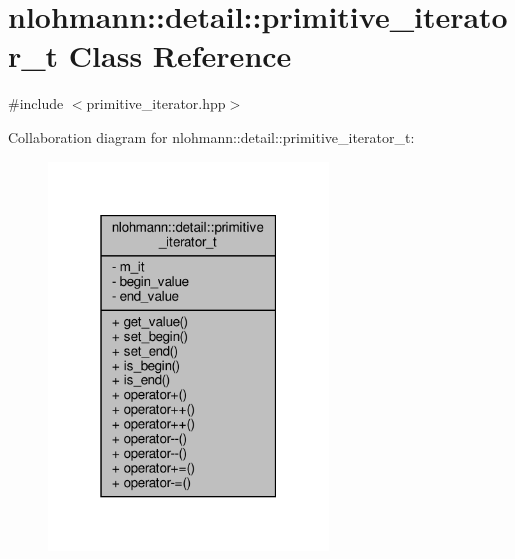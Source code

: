\hypertarget{classnlohmann_1_1detail_1_1primitive__iterator__t}{}\section{nlohmann\+:\+:detail\+:\+:primitive\+\_\+iterator\+\_\+t Class Reference}
\label{classnlohmann_1_1detail_1_1primitive__iterator__t}


{\ttfamily \#include $<$primitive\+\_\+iterator.\+hpp$>$}



Collaboration diagram for nlohmann\+:\+:detail\+:\+:primitive\+\_\+iterator\+\_\+t\+:
\nopagebreak
\begin{figure}[H]
\begin{center}
\leavevmode
\includegraphics[width=211pt]{classnlohmann_1_1detail_1_1primitive__iterator__t__coll__graph}
\end{center}
\end{figure}
